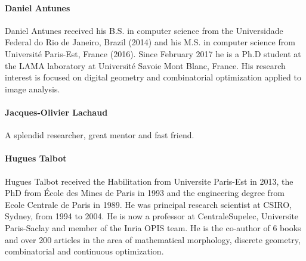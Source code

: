 

\paragraph{Daniel Antunes}
Daniel Antunes received his B.S. in computer science from the Universidade Federal do Rio de Janeiro, Brazil (2014) and his M.S. in  computer science from Université Paris-Est, France (2016). Since February 2017 he is a Ph.D student at the LAMA laboratory at Université Savoie Mont Blanc, France. His research interest is focused on digital geometry and combinatorial optimization applied to image analysis.


\paragraph{Jacques-Olivier Lachaud}
A splendid researcher, great mentor and fast friend.

\paragraph{Hugues Talbot}
Hugues Talbot received the Habilitation from Universite Paris-Est in 2013, the PhD from \'Ecole des Mines de Paris in
1993 and the engineering degree from Ecole Centrale de Paris in 1989. He was principal research scientist at CSIRO,
Sydney, from 1994 to 2004. He is now a professor at CentraleSupelec, Universite Paris-Saclay and member of the Inria
OPIS team. He is the co-author of 6 books and over 200 articles in the area of mathematical morphology, discrete
geometry, combinatorial and continuous optimization.

